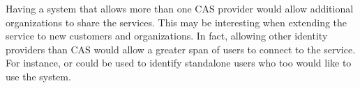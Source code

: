 Having a system that allows more than one CAS provider would allow additional organizations to share the services. This may be interesting when extending the service to new customers and organizations. In fact, allowing other identity providers than CAS would allow a greater span of users to connect to the service. For instance, \github{} or \facebook{} could be used to identify standalone users who too would like to use the system.

